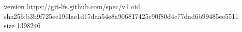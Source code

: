 version https://git-lfs.github.com/spec/v1
oid sha256:b3b9f725ee19f4ae1d17daa54e8a906817425e90f80d4c77dad6b99485ee5511
size 1398246
